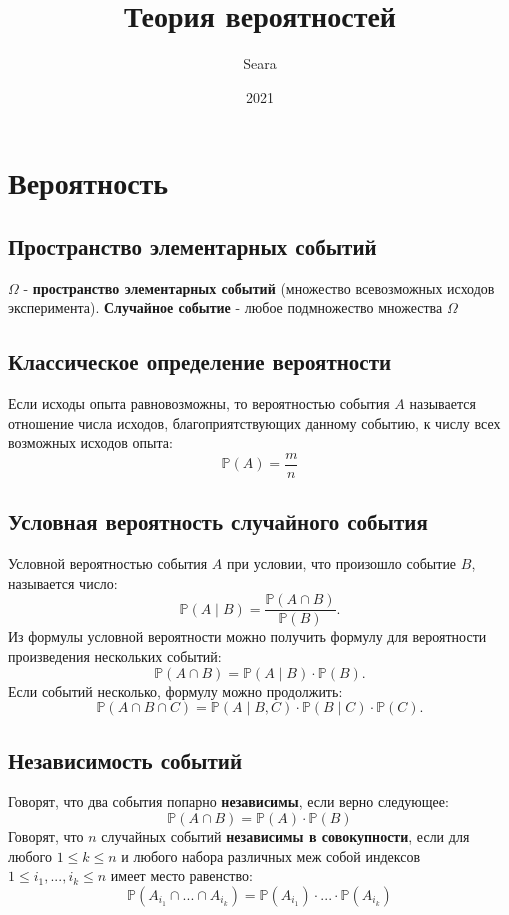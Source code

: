 \documentclass{article}
\title{Теория вероятностей}
\date{2021}
\author{Seara}
\newcommand{\PP}{\mathbb{P}}
\begin{document}
\maketitle
\newpage
{}

\section{Вероятность}

\subsection{Пространство элементарных событий}
$\Omega$ - {\bf пространство элементарных событий} (множество всевозможных исходов эксперимента). {\bf Случайное событие} - любое подмножество множества $\Omega$

\subsection{Классическое определение вероятности}
Если исходы опыта равновозможны, то вероятностью события $A$ называется отношение числа исходов, благоприятствующих данному событию, к числу всех возможных исходов опыта:
\[
\PP(A) = \frac{m}{n}
\]

\subsection{Условная вероятность случайного события}
Условной вероятностью события $A$ при условии, что произошло событие $B$, называется число:
\[
\PP(A \mid B) = \frac{\PP(A \cap B)}{\PP(B)}.
\]
Из формулы условной вероятности можно получить формулу для вероятности произведения нескольких событий: 
\[
\PP(A \cap B) = \PP(A \mid B) \cdot \PP(B).
\]
Если событий несколько, формулу можно продолжить:
\[
\PP(A \cap B \cap C) = \PP(A \mid B, C) \cdot \PP(B \mid C) \cdot \PP(C).
\]

\subsection{Независимость событий}
Говорят, что два события попарно {\bf независимы}, если верно следующее:
\[
\PP(A \cap B) = \PP(A) \cdot \PP(B)
\]
Говорят, что $n$ случайных событий {\bf независимы в совокупности}, если для любого $1 \leq k \leq n$ и любого набора различных меж собой индексов $1 \leq i_1, ..., i_k \leq n$ имеет место равенство:
\[
\PP(A_{i_1} \cap ... \cap A_{i_k}) = \PP(A_{i_1}) \cdot ... \cdot \PP(A_{i_k})
\]
\end{document}

